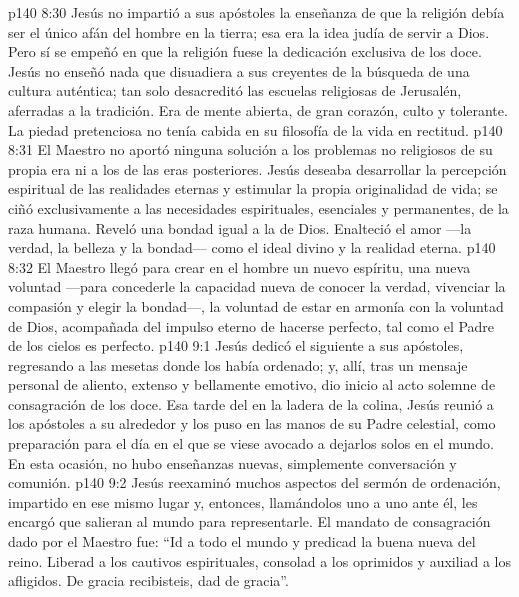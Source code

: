 \vs p140 8:30 Jesús no impartió a sus apóstoles la enseñanza de que la religión debía ser el único afán del hombre en la tierra; esa era la idea judía de servir a Dios. Pero sí se empeñó en que la religión fuese la dedicación exclusiva de los doce. Jesús no enseñó nada que disuadiera a sus creyentes de la búsqueda de una cultura auténtica; tan solo desacreditó las escuelas religiosas de Jerusalén, aferradas a la tradición. Era de mente abierta, de gran corazón, culto y tolerante. La piedad pretenciosa no tenía cabida en su filosofía de la vida en rectitud.
\vs p140 8:31 El Maestro no aportó ninguna solución a los problemas no religiosos de su propia era ni a los de las eras posteriores. Jesús deseaba desarrollar la percepción espiritual de las realidades eternas y estimular la propia originalidad de vida; se ciñó exclusivamente a las necesidades espirituales, esenciales y permanentes, de la raza humana. Reveló una bondad igual a la de Dios. Enalteció el amor ---la verdad, la belleza y la bondad--- como el ideal divino y la realidad eterna.
\vs p140 8:32 El Maestro llegó para crear en el hombre un nuevo espíritu, una nueva voluntad ---para concederle la capacidad nueva de conocer la verdad, vivenciar la compasión y elegir la bondad---, la voluntad de estar en armonía con la voluntad de Dios, acompañada del impulso eterno de hacerse perfecto, tal como el Padre de los cielos es perfecto.
\vs p140 9:1 Jesús dedicó el siguiente  a sus apóstoles, regresando a las mesetas donde los había ordenado; y, allí, tras un mensaje personal de aliento, extenso y bellamente emotivo, dio inicio al acto solemne de consagración de los doce. Esa tarde del  en la ladera de la colina, Jesús reunió a los apóstoles a su alrededor y los puso en las manos de su Padre celestial, como preparación para el día en el que se viese avocado a dejarlos solos en el mundo. En esta ocasión, no hubo enseñanzas nuevas, simplemente conversación y comunión.
\vs p140 9:2 Jesús reexaminó muchos aspectos del sermón de ordenación, impartido en ese mismo lugar y, entonces, llamándolos uno a uno ante él, les encargó que salieran al mundo para representarle. El mandato de consagración dado por el Maestro fue: “Id a todo el mundo y predicad la buena nueva del reino. Liberad a los cautivos espirituales, consolad a los oprimidos y auxiliad a los afligidos. De gracia recibisteis, dad de gracia”.
